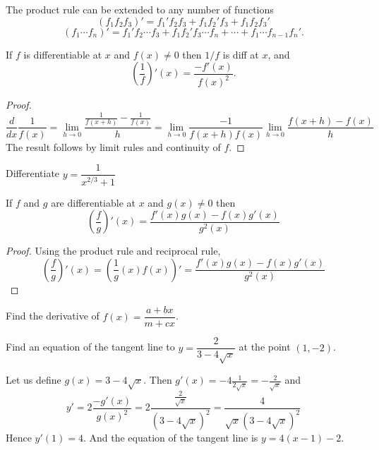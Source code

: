 \documentclass[../main.tex]{subfiles}
\begin{document}
  The product rule can be extended to any number of functions
  \[
    (f_1 f_2 f_3)' = f_1' f_2 f_3 + f_1 f_2' f_3  + f_1 f_2 f_3'
  \]
  \[
    (f_1 \cdots f_n)' = f_1' f_2 \cdots f_3 + f_1 f_2' f_3 \cdots f_n + \cdots + f_1 \cdots f_{n-1} f_n'.
  \]

  \begin{theorem}
    If $f$ is differentiable at $x$ and $f(x) \neq 0$ then $1/f$ is diff at $x$, and
    \[
      \left(\dfrac{1}{f} \right)'(x) = \dfrac{-f'(x)}{f(x)^2}.
    \]
  \end{theorem}
  \begin{proof}
    \[
      \dfrac{d}{dx} \dfrac{1}{f(x)} = \lim_{h \to 0} \frac{\frac{1}{f(x+h)}-\frac{1}{f(x)}}{h} = \lim_{h \to 0} \dfrac{-1}{f(x+h) f(x)} \lim_{h \to 0} \dfrac{f(x+h)-f(x)}{h}
    \]
    The result follows by limit rules and continuity of $f$.
  \end{proof}

  \begin{example}
    Differentiate $y = \dfrac{1}{x^{2/3} + 1}$
  \end{example}

  \begin{theorem}
    If $f$ and $g$ are differentiable at $x$ and $g(x) \neq 0$ then
    \[
      \left( \dfrac{f}{g} \right)'(x) =
      \dfrac{f'(x) g(x) - f(x) g'(x)}{g^2(x)}
    \]
  \end{theorem}
  \begin{proof}
    Using the product rule and reciprocal rule,
    \[
      \left( \dfrac{f}{g} \right)'(x) = \left( \dfrac{1}{g}(x) f(x) \right)' = \dfrac{f'(x) g(x) - f(x) g'(x)}{g^2(x)}
    \]
  \end{proof}

  \begin{example}
    Find the derivative of $f(x) = \dfrac{a + b x}{m + c x}$.
  \end{example}

  \begin{example}
    Find an equation of the tangent line to $y = \dfrac{2}{3-4 \sqrt{x}}$ at the point $(1, -2)$.
  \end{example}
  \begin{solution}
    Let us define $g(x)=3-4\sqrt{x}$. Then $g'(x)=-4 \frac{1}{2\sqrt{x}}=-\frac{2}{\sqrt{x}}$ and
    \[
      y'=2 \frac{-g'(x)}{g(x)^2}
      =2 \frac{\frac{2}{\sqrt{x}}}{(3-4\sqrt{x})^2}
      =\frac{4}{\sqrt{x}(3-4\sqrt{x})^2}
    \]
    Hence $y'(1)=4$. And the equation of the tangent line is $y=4(x-1)-2$.
  \end{solution}
\end{document}
